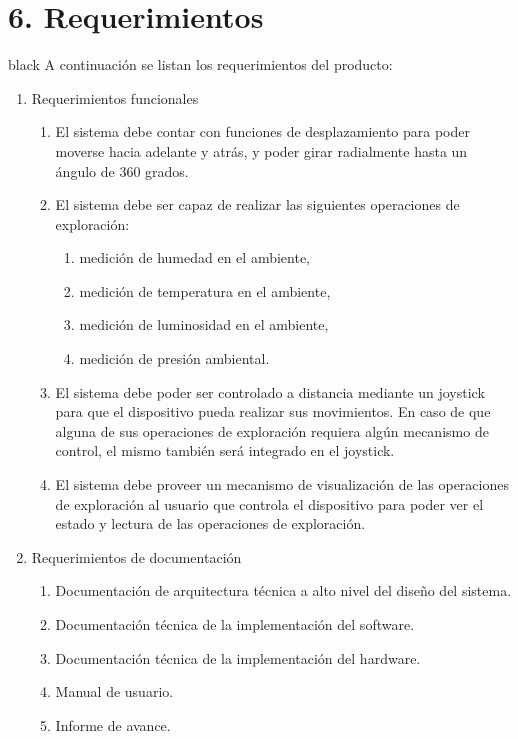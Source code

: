 \documentclass[
11pt, %
codirector, %
]{charter}
\begin{document}
\section{6. Requerimientos}
\label{sec:requerimientos}
\begin{consigna}{black}
A continuación se listan los requerimientos del producto:
\begin{enumerate}	
	\item Requerimientos funcionales		
	\begin{enumerate}			
		\item El sistema debe contar con funciones de desplazamiento para poder moverse hacia adelante y atrás, y poder girar radialmente hasta un ángulo de 360 grados.			
		\item El sistema debe ser capaz de realizar las siguientes operaciones de exploración:			
			\begin{enumerate}				
				\item medición de humedad en el ambiente,				
				\item medición de temperatura en el ambiente,				
				\item medición de luminosidad en el ambiente,				
				\item medición de presión ambiental.			
			\end{enumerate}			
		\item El sistema debe poder ser controlado a distancia mediante un joystick para que el dispositivo pueda realizar sus movimientos. En caso de que alguna de sus operaciones de exploración requiera algún mecanismo de control, el mismo también será integrado en el joystick.		
		\item El sistema debe proveer un mecanismo de visualización de las operaciones de exploración al usuario que controla el dispositivo para poder ver el estado y lectura de las operaciones de exploración.		
		\end{enumerate}	
	\item Requerimientos de documentación		
		\begin{enumerate}			
			\item Documentación de arquitectura técnica a alto nivel del diseño del sistema.			
			\item Documentación técnica de la implementación del software.			
			\item Documentación técnica de la implementación del hardware.			
			\item Manual de usuario.	
			\item Informe de avance.

\end{enumerate}
\end{enumerate}
\end{consigna}
\end{document}
